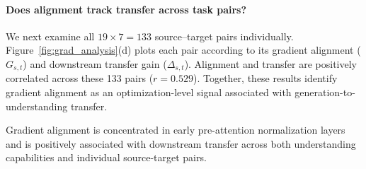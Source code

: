 \paragraph{Does alignment track transfer across task pairs?}
We next examine all $19\times7=133$ source–target pairs individually.
Figure~\ref{fig:grad_analysis}(d) plots each pair according to its gradient alignment ($G_{s,t}$) and downstream transfer gain ($\Delta_{s,t}$).
Alignment and transfer are positively correlated across these 133 pairs ($r=0.529$).
Together, these results identify gradient alignment as an optimization-level signal associated with generation-to-understanding transfer.
\begin{findingbox}
Gradient alignment is concentrated in early pre-attention normalization layers and is positively associated with downstream transfer across both understanding capabilities and individual source-target pairs.
\end{findingbox}
\par\endgroup






